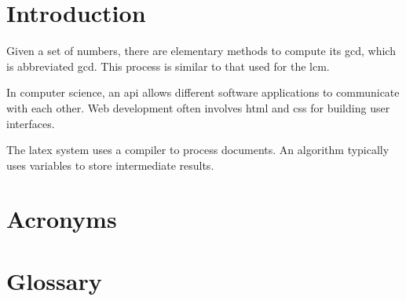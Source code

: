 \documentclass{article}
\begin{document}
	
	\section*{Introduction}
	
	Given a set of numbers, there are elementary methods to compute 
	its \acrlong{gcd}, which is abbreviated \acrshort{gcd}. This process 
	is similar to that used for the \acrfull{lcm}.
	
	In computer science, an \acrfull{api} allows different software 
	applications to communicate with each other. Web development 
	often involves \acrshort{html} and \acrshort{css} for building 
	user interfaces.
	
	The \gls{latex} system uses a \gls{compiler} to process documents. 
	An \gls{algorithm} typically uses \glspl{variable} to store 
	intermediate results.
	
	\clearpage
	
	\section*{Acronyms}
	\printglossary[type=\acronymtype, title=List of Acronyms]
	
	\clearpage
	
	\section*{Glossary}
	\printglossary[title=General Glossary]
	
\end{document}
